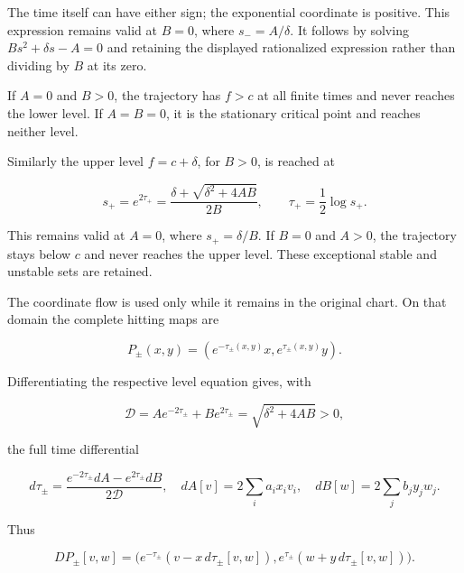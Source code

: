 The time itself can have either sign; the exponential coordinate is positive. This expression remains valid at \(B=0\), where \(s_-=A/\delta\). It follows by solving
\(Bs^2+\delta s-A=0\) and retaining the displayed rationalized expression rather than dividing by \(B\) at its zero.

If \(A=0\) and \(B>0\), the trajectory has \(f>c\) at all finite times and never reaches the lower level. If \(A=B=0\), it is the stationary critical point and reaches neither level.

Similarly the upper level \(f=c+\delta\), for \(B>0\), is reached at

\begin{equation}
s_+=e^{2\tau_+}
=\frac{\delta+\sqrt{\delta^2+4AB}}{2B},
\qquad
\tau_+=\frac12\log s_+.
\label{courseIII:relative-morse-functions-and-original-handles:eq:3.7}
\end{equation}

This remains valid at \(A=0\), where \(s_+=\delta/B\). If \(B=0\) and \(A>0\), the trajectory stays below \(c\) and never reaches the upper level. These exceptional stable and unstable sets are retained.

The coordinate flow is used only while it remains in the original chart. On that domain the complete hitting maps are

\begin{equation}
P_\pm(x,y)=(e^{-\tau_\pm(x,y)}x,e^{\tau_\pm(x,y)}y).
\label{courseIII:relative-morse-functions-and-original-handles:eq:3.8}
\end{equation}

Differentiating the respective level equation gives, with

\[
\mathcal D=Ae^{-2\tau_\pm}+Be^{2\tau_\pm}
=\sqrt{\delta^2+4AB}>0,
\]

the full time differential

\begin{equation}
d\tau_\pm=
\frac{e^{-2\tau_\pm}dA-e^{2\tau_\pm}dB}{2\mathcal D},
\quad
dA[v]=2\sum_i a_ix_iv_i,\quad
dB[w]=2\sum_j b_jy_jw_j.
\label{courseIII:relative-morse-functions-and-original-handles:eq:3.9}
\end{equation}

Thus

\begin{equation}
DP_\pm[v,w]
=\bigl(e^{-\tau_\pm}(v-x\,d\tau_\pm[v,w]),
       e^{\tau_\pm}(w+y\,d\tau_\pm[v,w])\bigr).
\label{courseIII:relative-morse-functions-and-original-handles:eq:3.10}
\end{equation}

